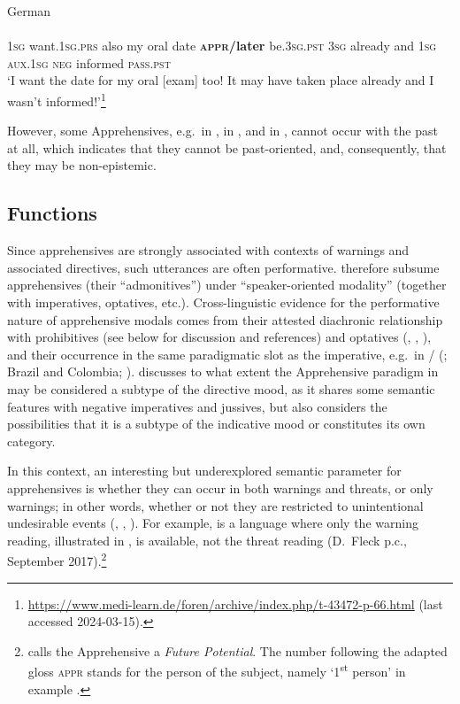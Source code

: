 \documentclass[output=paper,colorlinks,citecolor=brown]{langscibook}
\begin{document}
\ea \label{ex:intro20} \textnormal{German} \\
\\
\textsc{1sg} want.\textsc{1sg.prs} also my oral date 
\textsc{\textbf{appr/}}\textbf{later} be.\textsc{3sg.pst} \textsc{3sg} already and \textsc{1sg} \textsc{aux.1sg} \textsc{neg} informed \textsc{pass.pst} \\
\glt `I want the date for my oral [exam] too! It may have taken place already and I wasn't informed!'\footnote{\url{https://www.medi-learn.de/foren/archive/index.php/t-43472-p-66.html} (last accessed 2024-03-15).}
\z

 However, some Apprehensives, e.g.\  in  \citep{chapters/fedotov}, in  \citep{chapters/daniel}, and in  \citep{chapters/treis}, cannot occur with the past at all, which indicates that they cannot be past-oriented, and, consequently, that they may be non-epistemic.

\subsection{Functions}
\label{intro:functions}

Since apprehensives are strongly associated with contexts of warnings and associated directives, such utterances are often performative. \citet[179]{bybeeetal1994} therefore subsume apprehensives (their ``admonitives'') under ``speaker-oriented modality'' (together with imperatives, optatives, etc.). Cross-linguistic evidence for the performative nature of apprehensive modals comes from their attested diachronic relationship with prohibitives (see below for discussion and references) and optatives (\citealt{Dobrushina2006}, \citealt{chapters/lahaussois}, \citealt{chapters/wiemer}), and their occurrence in the same paradigmatic slot as the imperative, e.g.\ in / (; Brazil and Colombia; \cite[268, 309]{stenzel2013}). \citet{chapters/treis} discusses to what extent the Apprehensive paradigm in  may be considered a subtype of the directive mood, as it shares some semantic features with negative imperatives and jussives, but also considers the possibilities that it is a subtype of the indicative mood or constitutes its own category. 

In this context, an interesting but underexplored semantic parameter for apprehensives is whether they can occur in both warnings and threats, or only warnings; in other words, whether or not they are restricted to unintentional undesirable events (\cite{vuillermet2017b}, \cite[273--274]{vuillermet2018a}, \cite{VuillermetM2018questionnaire}). For example,  is a language where only the warning reading, illustrated in , is available, not the threat reading (D.\ Fleck p.c., September 2017).\footnote{\citet{fleck2003} calls the  Apprehensive a \textit{Future Potential}. The number following the adapted gloss \textsc{appr} stands for the person of the subject, namely `1\textsuperscript{st} person' in example .}
\end{document}
